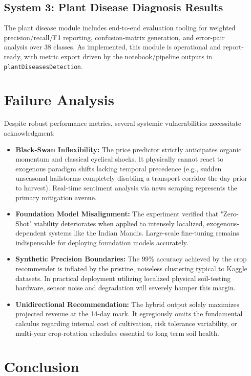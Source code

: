 \documentclass[conference]{IEEEtran}
\begin{document}
\subsection{System 3: Plant Disease Diagnosis Results}
The plant disease module includes end-to-end evaluation tooling for weighted precision/recall/F1 reporting, confusion-matrix generation, and error-pair analysis over 38 classes. As implemented, this module is operational and report-ready, with metric export driven by the notebook/pipeline outputs in \texttt{plantDiseasesDetection}.

\section{Failure Analysis}

Despite robust performance metrics, several systemic vulnerabilities necessitate acknowledgment:
\begin{itemize}
    \item \textbf{Black-Swan Inflexibility:} The price predictor strictly anticipates organic momentum and classical cyclical shocks. It physically cannot react to exogenous paradigm shifts lacking temporal precedence (e.g., sudden unseasonal hailstorms completely disabling a transport corridor the day prior to harvest). Real-time sentiment analysis via news scraping represents the primary mitigation avenue.
    \item \textbf{Foundation Model Misalignment:} The experiment verified that "Zero-Shot" viability deteriorates when applied to intensely localized, exogenous-dependent systems like the Indian Mandis. Large-scale fine-tuning remains indispensable for deploying foundation models accurately.
    \item \textbf{Synthetic Precision Boundaries:} The $99\%$ accuracy achieved by the crop recommender is inflated by the pristine, noiseless clustering typical to Kaggle datasets. In practical deployment utilizing localized physical soil-testing hardware, sensor noise and degradation will severely hamper this margin.
    \item \textbf{Unidirectional Recommendation:} The hybrid output solely maximizes projected revenue at the 14-day mark. It egregiously omits the fundamental calculus regarding internal cost of cultivation, risk tolerance variability, or multi-year crop-rotation schedules essential to long term soil health.
\end{itemize}

\section{Conclusion}
\end{document}
